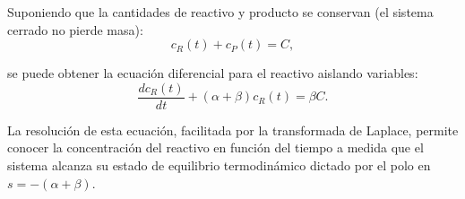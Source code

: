 Suponiendo que la cantidades de reactivo y producto se conservan (el sistema cerrado no pierde masa):
\begin{equation}
	c_{R}(t) + c_{P}(t) = C,
\end{equation}

se puede obtener la ecuaci\'{o}n diferencial para el reactivo aislando variables:
\begin{equation}
	\frac{dc_{R}(t)}{dt} + (\alpha + \beta) c_{R}(t) = \beta C.  \label{sisTres}
\end{equation}

La resolución de esta ecuación, facilitada por la transformada de Laplace, permite conocer la concentración del reactivo en función del tiempo a medida que el sistema alcanza su estado de equilibrio termodinámico dictado por el polo en $s = -(\alpha + \beta)$.